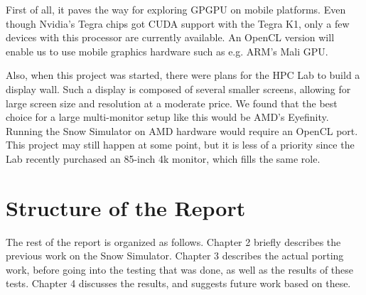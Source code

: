 First of all, it paves the way for exploring GPGPU on mobile platforms. Even though Nvidia's Tegra chips got CUDA support with the Tegra K1, only a few devices with this processor are currently available. An OpenCL version will enable us to use mobile graphics hardware such as e.g. ARM's Mali GPU.

Also, when this project was started, there were plans for the HPC Lab to build a display wall. Such a display is composed of several smaller screens, allowing for large screen size and resolution at a moderate price. We found that the best choice for a large multi-monitor setup like this would be AMD's Eyefinity. Running the Snow Simulator on AMD hardware would require an OpenCL port. This project may still happen at some point, but it is less of a priority since the Lab recently purchased an 85-inch 4k monitor, which fills the same role.

\section{Structure of the Report}
The rest of the report is organized as follows. Chapter 2 briefly describes the previous work on the Snow Simulator. Chapter 3 describes the actual porting work, before going into the testing that was done, as well as the results of these tests. Chapter 4 discusses the results, and suggests future work based on these.
